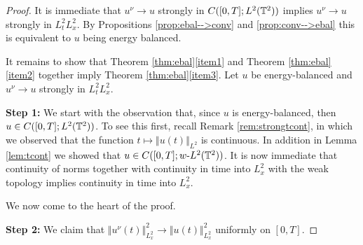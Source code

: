 \documentclass[reqno,12pt]{amsart}
\begin{document}
\begin{proof}

It is immediate that $u^\nu \to u$ strongly in $C([0,T];L^2(\mathbb{T}^2))$ implies $u^\nu \to u$ strongly in $L^2_t L^2_x$. By Propositions \ref{prop:ebal-->conv} and \ref{prop:conv-->ebal} this is equivalent to $u$ being energy balanced.

It remains to show that Theorem \ref{thm:ebal}\eqref{item1} and Theorem \ref{thm:ebal}\eqref{item2} together imply Theorem \ref{thm:ebal}\eqref{item3}. Let $u$ be energy-balanced and $u^\nu \to u$ strongly in $L^2_tL^2_x$.

\textbf{Step 1:}
We start with the observation that, since $u$ is energy-balanced, then $u\in C([0,T];L^2(\mathbb{T}^2))$. To see this first, recall Remark \ref{rem:strongtcont}, in which we observed that the function $t \mapsto \Vert u(t) \Vert_{L^2}$ is continuous. In addition in Lemma \ref{lem:tcont} we showed that $u \in C([0,T];w\text{-}L^2(\mathbb{T}^2))$. It is now immediate that continuity of norms together with continuity in time into $L^2_x$ with the weak topology implies continuity in time into $L^2_x$.


 We now come to the heart of the proof.

 \textbf{Step 2:}
We claim that $\Vert u^\nu(t) \Vert_{L^2_x}^2 \to \Vert u(t) \Vert_{L^2_x}^2$ uniformly on $[0, T]$.


\end{proof}
\end{document}
